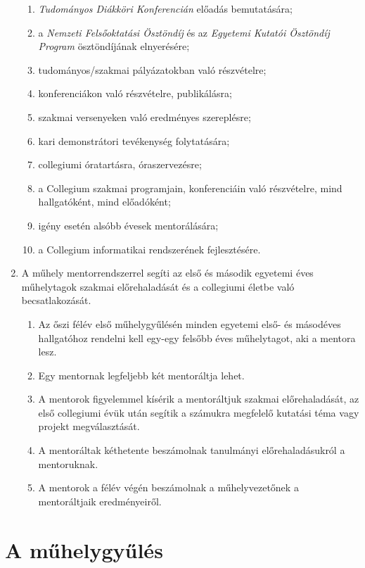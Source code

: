 \documentclass{../styles/rulebook}
\begin{document}
\begin{enumerate}
\begin{enumerate}
		      \item \emph{Tudományos Diákköri Konferencián} előadás bemutatására;
		      \item a \emph{Nemzeti Felsőoktatási Ösztöndíj} és az \emph{Egyetemi Kutatói Ösztöndíj Program} ösztöndíjának elnyerésére;
		      \item tudományos/szakmai pályázatokban való részvételre;
		      \item konferenciákon való részvételre, publikálásra;
		      \item szakmai versenyeken való eredményes szereplésre;
		      \item kari demonstrátori tevékenység folytatására;
		      \item collegiumi óratartásra, óraszervezésre;
		      \item a Collegium szakmai programjain, konferenciáin való részvételre, mind hallgatóként, mind előadóként;
		      \item igény esetén alsóbb évesek mentorálására;
		      \item a Collegium informatikai rendszerének fejlesztésére.
	      \end{enumerate}
	\item A műhely mentorrendszerrel segíti az első és második egyetemi éves műhelytagok szakmai előrehaladását és a collegiumi életbe való becsatlakozását.
	      \begin{enumerate}
		      \item Az őszi félév első műhelygyűlésén minden egyetemi első- és másodéves hallgatóhoz rendelni kell egy-egy felsőbb éves műhelytagot, aki a mentora lesz.
		      \item Egy mentornak legfeljebb két mentoráltja lehet.
		      \item A mentorok figyelemmel kísérik a mentoráltjuk szakmai előrehaladását, az első collegiumi évük után segítik a számukra megfelelő kutatási téma vagy projekt megválasztását.
		      \item A mentoráltak kéthetente beszámolnak tanulmányi előrehaladásukról a mentoruknak.
		      \item A mentorok a félév végén beszámolnak a műhelyvezetőnek a mentoráltjaik eredményeiről.
	      \end{enumerate}
\end{enumerate}

\section{A műhelygyűlés}
\label{par:muhelygyules}
\end{document}
